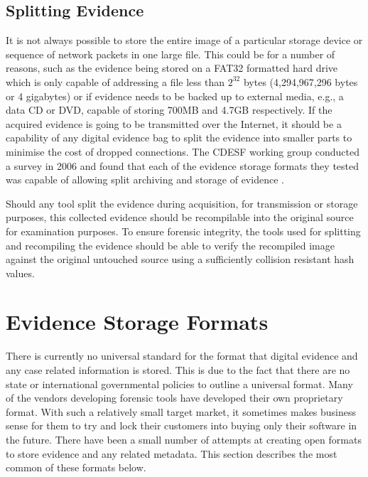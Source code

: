 \documentclass[runningheads,a4paper]{llncs}
\begin{document}
\subsection{Splitting Evidence}
\label{ch2:splitting}

It is not always possible to store the entire image of a particular storage device or sequence of network packets in one large file. This could be for a number of reasons, such as the evidence being stored on a FAT32 formatted hard drive which is only capable of addressing a file less than $2^{32}$ bytes (4,294,967,296 bytes or 4 gigabytes) or if evidence needs to be backed up to external media, e.g., a data CD or DVD, capable of storing 700MB and 4.7GB respectively. If the acquired evidence is going to be transmitted over the Internet, it should be a capability of any digital evidence bag to split the evidence into smaller parts to minimise the cost of dropped connections. The CDESF working group conducted a survey in 2006 and found that each of the evidence storage formats they tested was capable of allowing split archiving and storage of evidence \cite{dfrws2006}. 

Should any tool split the evidence during acquisition, for transmission or storage purposes, this collected evidence should be recompilable into the original source for examination purposes. To ensure forensic integrity, the tools used for splitting and recompiling the evidence should be able to verify the recompiled image against the original untouched source using a sufficiently collision resistant hash values.

\section{Evidence Storage Formats}
\label{storage}

There is currently no universal standard for the format that digital evidence and any case related information is stored. This is due to the fact that there are no state or international governmental policies to outline a universal format. Many of the vendors developing forensic tools have developed their own proprietary format. With such a relatively small target market, it sometimes makes business sense for them to try and lock their customers into buying only their software in the future. There have been a small number of attempts at creating open formats to store evidence and any related metadata. This section describes the most common of these formats below.
\end{document}
